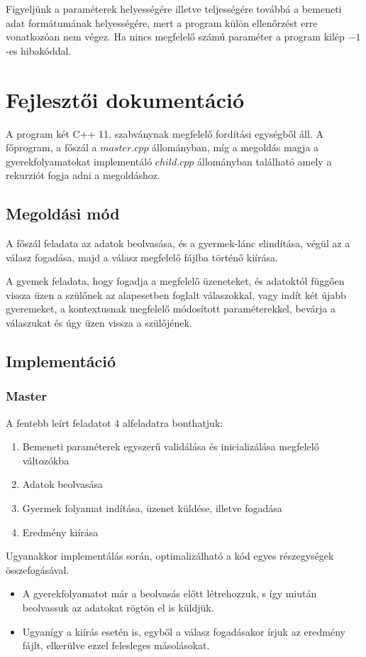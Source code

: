 \documentclass[12pt]{article}
\begin{document}
Figyeljünk a paraméterek helyességére illetve teljességére továbbá a bemeneti adat formátumának helyességére, mert a program külön ellenőrzést erre vonatkozóan nem végez. Ha nincs megfelelő számú paraméter a program kilép $-1$-es hibakóddal.

\section{Fejlesztői dokumentáció}

A program két C++ 11. szabványnak megfelelő fordítási egységből áll. A főprogram, a főszál a $master.cpp$ állományban, míg a megoldás magja a gyerekfolyamatokat implementáló $child.cpp$ állományban található amely a rekurziót fogja adni a megoldáshoz.

\subsection{Megoldási mód}


A főszál feladata az adatok beolvasása, és a gyermek-lánc elindítása, végül az a válasz fogadása, majd a válasz megfelelő fájlba történő kiírása.

A gyemek feladata, hogy fogadja a megfelelő üzeneteket, és adatoktól függően vissza üzen a szülőnek az alapesetben foglalt válaszokkal, vagy indít két újabb gyeremeket, a kontextusnak megfelelő módosított paraméterekkel, bevárja a válaszukat és úgy üzen vissza a szülőjének.

\subsection{Implementáció}
	\subsubsection{Master}
    
    A fentebb leírt feladatot 4 alfeladatra bonthatjuk:
    \begin{enumerate}
    \item Bemeneti paraméterek egyszerű validálása és inicializálása megfelelő változókba
    \item Adatok beolvasása
    \item Gyermek folyamat indítása, üzenet küldése, illetve fogadása
    \item Eredmény kiírása
	\end{enumerate}
    
    Ugyanakkor implementálás során, optimalizálható a kód egyes részegységek összefogásával.
    \begin{itemize}
    \item A gyerekfolyamatot már a beolvasás előtt létrehozzuk, s így miután beolvassuk az adatokat rögtön el is küldjük.
    \item Ugyanígy a kiírás esetén is, egyből a válasz fogadásakor írjuk az eredmény fájlt, elkerülve ezzel felesleges másolásokat.
    \end{itemize}
    
\end{document}
